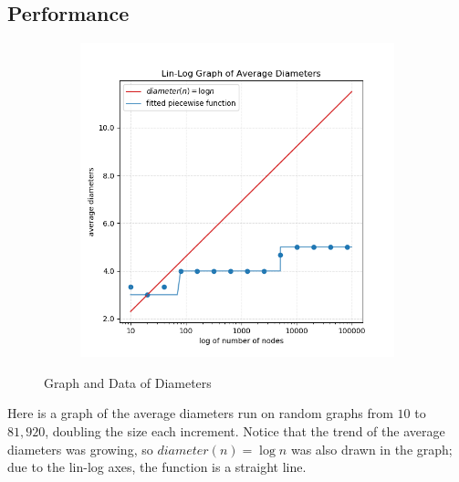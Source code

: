 \documentclass{article}
\begin{document}
\subsection{Performance}
    \begin{figure}[H]
        \centering
        \begin{subfigure}{0.6\textwidth}
            \includegraphics[width=\linewidth]{"../images/diameter"}
        \end{subfigure}
        \caption{Graph and Data of Diameters}
    \end{figure}
    Here is a graph of the average diameters run on random graphs from $10$ to 
    $81,920$, doubling the size each increment. Notice that the trend of the
    average diameters was growing, so $diameter(n) = \log{n}$ was also drawn in 
    the graph; due to the lin-log axes, the function is a straight line.
\end{document}
